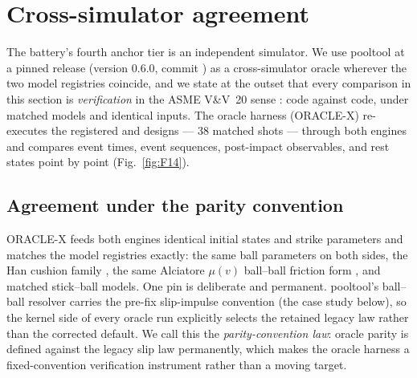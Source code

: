 \section{Cross-simulator agreement}
\label{sec:oracle}

The battery's fourth anchor tier is an independent simulator. We use
pooltool \citep{kiefl2024pooltool} at a pinned release (version 0.6.0,
commit ) as a cross-simulator oracle wherever the two model
registries coincide, and we state at the outset that every comparison in
this section is \emph{verification} in the ASME V\&V~20 sense
\citep{asme2009vv20}: code against code, under matched models and identical
inputs. The oracle harness (ORACLE-X) re-executes the registered
 and  designs --- 38 matched shots --- through both
engines and compares event times, event sequences, post-impact observables,
and rest states point by point (Fig.~\ref{fig:F14}).


\subsection{Agreement under the parity convention}

ORACLE-X feeds both engines identical initial states and strike parameters
and matches the model registries exactly: the same ball parameters on both
sides, the Han cushion family \citep{han2005dynamics}, the same Alciatore
$\mu(v)$ ball--ball friction form \citep{alciatore_tp_a14}, and matched
stick--ball models. One pin is deliberate and permanent. pooltool's
ball--ball resolver carries the pre-fix slip-impulse convention (the case
study below), so the kernel side of every oracle run explicitly selects
the retained legacy law rather than the corrected default. We call this
the \emph{parity-convention law}: oracle parity is defined against the
legacy slip law permanently, which makes the oracle harness a
fixed-convention verification instrument rather than a moving target.

